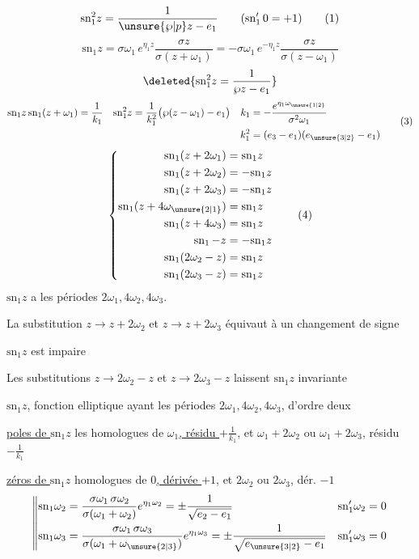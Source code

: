 \[
\mathrm{sn}_1^2z=\frac1{\unsure{\wp|p}z-e_1}\qquad(\mathrm{sn}'_1\,0=+1) \tag*{(1)}
\]
\[
\mathrm{sn}_1z=\sigma\omega_1\,e^{\eta_1z}\frac{\sigma z}{\sigma(z+\omega_1)}
=-\sigma\omega_1\,e^{-\eta_1z}\frac{\sigma z}{\sigma(z-\omega_1)} \tag*{(2)}
\]
\[
\deleted{\mathrm{sn}_1^2z=\frac{1}{\wp z-e_1}}
\]
\[
\begin{aligned}
\mathrm{sn}_1z\,\mathrm{sn}_1(z+\omega_1)&=\frac1{k_1}&
\mathrm{sn}_1^2z&=\frac1{k_1^2}\bigl(\wp(z-\omega_1)-e_1\bigr)&
k_1&=-\frac{e^{\eta_1\omega_{\unsure{1|2}}}}{\sigma^2\omega_1}\\
&&&&k_1^2&=(e_3-e_1)(e_{\unsure{3|2}}-e_1)
\end{aligned}\tag*{(3)}
\]
\[
\left\{\begin{aligned}
\mathrm{sn}_1(z+2\omega_1)&=\mathrm{sn}_1z\\
\mathrm{sn}_1(z+2\omega_2)&=-\mathrm{sn}_1z\\
\mathrm{sn}_1(z+2\omega_3)&=-\mathrm{sn}_1z\\
\mathrm{sn}_1(z+4\omega_{\unsure{2|1}})&=\mathrm{sn}_1z\\
\mathrm{sn}_1(z+4\omega_3)&=\mathrm{sn}_1z\\
\mathrm{sn}_1\,{-z}&=-\mathrm{sn}_1z\\
\mathrm{sn}_1(2\omega_2-z)&=\mathrm{sn}_1z\\
\mathrm{sn}_1(2\omega_3-z)&=\mathrm{sn}_1z
\end{aligned}\right. \tag*{(4)}
\]
$\mathrm{sn}_1z$ a les périodes $2\omega_1,4\omega_2,4\omega_3$.

La substitution $z\to z+2\omega_2$ et $z\to z+2\omega_3$ équivaut à un changement de signe

$\mathrm{sn}_1z$ est impaire

Les substitutions $z\to2\omega_2-z$ et $z\to2\omega_3-z$ laissent $\mathrm{sn}_1z$ invariante

$\mathrm{sn}_1z$, fonction elliptique ayant les périodes $2\omega_1,4\omega_2,4\omega_3$, d'ordre deux

\uline{poles de $\mathrm{sn}_1z$} les homologues de \uline{$\omega_1$, résidu $+\frac1{k_1}$}, et $\omega_1+2\omega_2$ ou $\omega_1+2\omega_3$, résidu $-\frac1{k_1}$

\uline{zéros de $\mathrm{sn}_1z$} homologues de \uline{$0$, dérivée $+1$}, et $2\omega_2$ ou $2\omega_3$, dér. $-1$
\[
\left\Vert\begin{aligned}
\mathrm{sn}_1\omega_2&=\frac{\sigma\omega_1\,\sigma\omega_2}{\sigma(\omega_1+\omega_2)}e^{\eta_1\omega_2}=\pm\frac{1}{\sqrt{e_2-e_1}}&
\mathrm{sn}'_1\omega_2&=0\\
\mathrm{sn}_1\omega_3&=\frac{\sigma\omega_1\,\sigma\omega_3}{\sigma(\omega_1+\omega_{\unsure{2|3}})}e^{\eta_1\omega_3}=\pm\frac{1}{\sqrt{e_{\unsure{3|2}}-e_1}}&
\mathrm{sn}'_1\omega_3&=0
\end{aligned}\right.
\]

